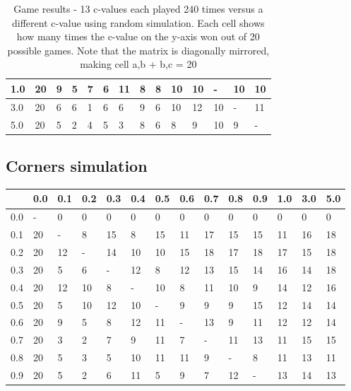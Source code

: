 \documentclass[
11pt, %
english, %
singlespacing, %
headsepline, %
]{MastersDoctoralThesis} %
\begin{document}
\begin{appendices}
\begin{table}[H]
\begin{tabular}{|l||l|l|l|l|l|l|l|l|l|l|l|l|l|}
		1.0 & 20  & 9   & 5   & 7   & 6   & 11  & 8   & 8   & 10  & 10  & -   & 10  & 10  \\ \hline
		3.0 & 20  & 6   & 6   & 1   & 6   & 6   & 9   & 6   & 10  & 12  & 10  & -   & 11  \\ \hline
		5.0 & 20  & 5   & 2   & 4   & 5   & 3   & 8   & 6   & 8   & 9   & 10  & 9   & -   \\ \hline
	\end{tabular}
	\caption{Game results - 13 c-values each played 240 times versus a different c-value using random simulation. Each cell shows how many times the c-value on the y-axis won out of 20 possible games. Note that the matrix is diagonally mirrored, making cell a,b + b,c = 20}
	\label{table:ranking-matrix-random}
\end{table}

\subsection{Corners simulation}
\begin{table}[H]
	\centering
	\begin{tabular}{|l||l|l|l|l|l|l|l|l|l|l|l|l|l|}
		\hline 
		& 0.0 & 0.1 & 0.2 & 0.3 & 0.4 & 0.5 & 0.6 & 0.7 & 0.8 & 0.9 & 1.0 & 3.0 & 5.0 \\ \hline
		\hline
		0.0 & -   & 0   & 0   & 0   & 0   & 0   & 0   & 0   & 0   & 0   & 0   & 0   & 0   \\ \hline
		0.1 & 20  & -   & 8   & 15  & 8   & 15  & 11  & 17  & 15  & 15  & 11  & 16  & 18  \\ \hline
		0.2 & 20  & 12  & -   & 14  & 10  & 10  & 15  & 18  & 17  & 18  & 17  & 15  & 18  \\ \hline
		0.3 & 20  & 5   & 6   & -   & 12  & 8   & 12  & 13  & 15  & 14  & 16  & 14  & 18  \\ \hline
		0.4 & 20  & 12  & 10  & 8   & -   & 10  & 8   & 11  & 10  & 9   & 14  & 12  & 16  \\ \hline
		0.5 & 20  & 5   & 10  & 12  & 10  & -   & 9   & 9   & 9   & 15  & 12  & 14  & 14  \\ \hline
		0.6 & 20  & 9   & 5   & 8   & 12  & 11  & -   & 13  & 9   & 11  & 12  & 12  & 14  \\ \hline
		0.7 & 20  & 3   & 2   & 7   & 9   & 11  & 7   & -   & 11  & 13  & 11  & 15  & 15  \\ \hline
		0.8 & 20  & 5   & 3   & 5   & 10  & 11  & 11  & 9   & -   & 8   & 11  & 13  & 11  \\ \hline
		0.9 & 20  & 5   & 2   & 6   & 11  & 5   & 9   & 7   & 12  & -   & 13  & 14  & 13  \\ \hline

\end{tabular}
\end{table}
\end{appendices}
\end{document}
